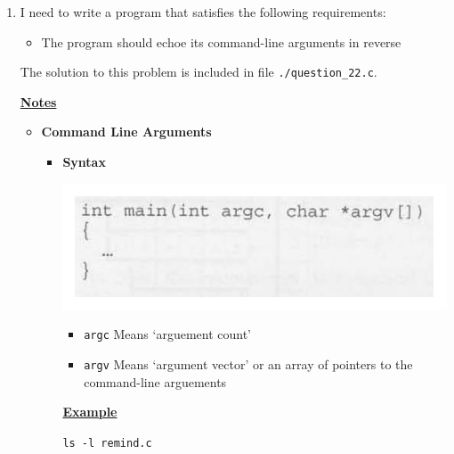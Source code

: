 \documentclass[12pt]{article}
\begin{document}
\begin{enumerate}[1.]
\begin{itemize}
\begin{itemize}
        \end{itemize}
    \end{itemize}

    \item

    I need to write a program that satisfies the following requirements:

    \begin{itemize}
        \item The program should echoe its command-line arguments in reverse
    \end{itemize}

    \bigskip

    The solution to this problem is included in file \texttt{./question\_22.c}.

    \bigskip

    \underline{\textbf{Notes}}

    \begin{itemize}
        \item \textbf{Command Line Arguments}

        \begin{itemize}
            \item \textbf{Syntax}

            \begin{center}
            \includegraphics[width=0.6\linewidth]{images/review_6_solution_10.png}
            \end{center}

            \bigskip

            \begin{itemize}
                \item \texttt{argc} Means `arguement count'
                \item \texttt{argv} Means `argument vector' or an array of pointers to the command-line arguements
            \end{itemize}

            \bigskip

            \underline{\textbf{Example}}

            \bigskip

            \texttt{ls -l remind.c}


\end{itemize}
\end{itemize}
\end{enumerate}
\end{document}
